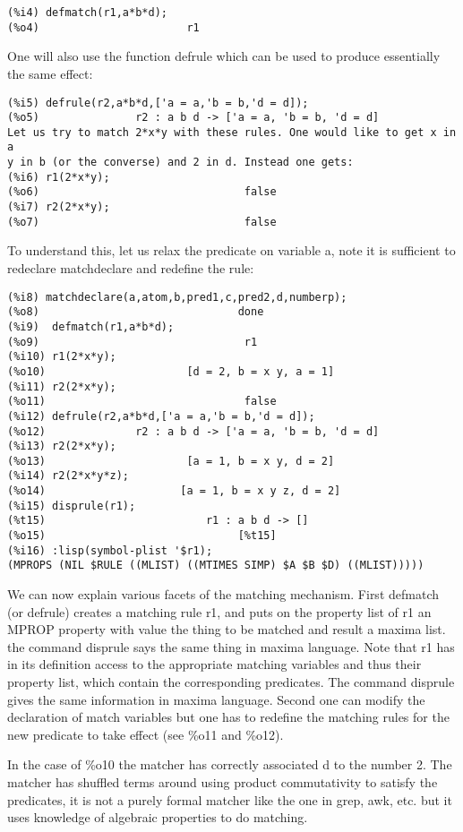 \documentclass[a4paper,11pt]{article}
\begin{document}
\begin{verbatim}
(%i4) defmatch(r1,a*b*d);
(%o4)                       r1
\end{verbatim}                                
One will also use the function defrule which can be used to produce 
essentially the same effect:
\begin{verbatim}
(%i5) defrule(r2,a*b*d,['a = a,'b = b,'d = d]);
(%o5)               r2 : a b d -> ['a = a, 'b = b, 'd = d]
Let us try to match 2*x*y with these rules. One would like to get x in a
y in b (or the converse) and 2 in d. Instead one gets:
(%i6) r1(2*x*y);
(%o6)                                false
(%i7) r2(2*x*y);
(%o7)                                false
\end{verbatim}
To understand this, let us relax the predicate on variable a, note
it is sufficient to redeclare matchdeclare and redefine the rule:
\begin{verbatim}
(%i8) matchdeclare(a,atom,b,pred1,c,pred2,d,numberp);
(%o8)                               done
(%i9)  defmatch(r1,a*b*d);
(%o9)                                r1
(%i10) r1(2*x*y);
(%o10)                      [d = 2, b = x y, a = 1]
(%i11) r2(2*x*y);
(%o11)                               false
(%i12) defrule(r2,a*b*d,['a = a,'b = b,'d = d]);
(%o12)              r2 : a b d -> ['a = a, 'b = b, 'd = d]
(%i13) r2(2*x*y);
(%o13)                      [a = 1, b = x y, d = 2]
(%i14) r2(2*x*y*z);
(%o14)                     [a = 1, b = x y z, d = 2]
(%i15) disprule(r1);
(%t15)                         r1 : a b d -> []
(%o15)                              [%t15]
(%i16) :lisp(symbol-plist '$r1);
(MPROPS (NIL $RULE ((MLIST) ((MTIMES SIMP) $A $B $D) ((MLIST)))))
\end{verbatim}

We can now explain various facets of the matching mechanism.  First
defmatch (or defrule) creates a matching rule r1, and puts on the
property list of r1 an MPROP property with value the thing to be
matched and result a maxima list. the command disprule says the same
thing in maxima language.  Note that r1 has in its definition access
to the appropriate matching variables and thus their property list,
which contain the corresponding predicates. The command disprule gives
the same information in maxima language. Second one can modify the
declaration of match variables but one has to redefine the matching
rules for the new predicate to take effect (see \%o11 and \%o12).  

In the case of \%o10 the matcher has correctly associated d to the
number 2.  The matcher has shuffled terms around using product
commutativity to satisfy the predicates, it is not a purely formal
matcher like the one in grep, awk, etc. but it uses knowledge of
algebraic properties to do matching.
\end{document}

